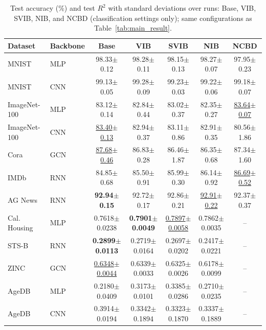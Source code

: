 \begin{table}[t]
\centering
\caption{Test accuracy (\%) and test $R^2$ with standard deviations over runs: Base, VIB, SVIB, NIB, and NCBD (classification settings only); same configurations as Table~\ref{tab:main_result}.}
\label{tab:main_result_std_baselines}
\small
{
\setlength{\tabcolsep}{1.5pt}
\begin{tabular}{llccccc}
\hline
Dataset & Backbone & Base & VIB & SVIB & NIB & NCBD \\
\hline
MNIST & MLP & 98.33$\pm$0.12 & 98.28$\pm$0.11 & 98.15$\pm$0.13 & 98.27$\pm$0.07 & 97.95$\pm$0.23 \\
MNIST & CNN & 99.13$\pm$0.05 & 99.28$\pm$0.09 & 99.23$\pm$0.03 & 99.22$\pm$0.06 & 99.18$\pm$0.07 \\
ImageNet-100 & MLP & 83.12$\pm$0.14 & 82.84$\pm$0.44 & 83.02$\pm$0.37 & 82.35$\pm$0.27 & \underline{83.64$\pm$0.07} \\
ImageNet-100 & CNN & \underline{83.40$\pm$0.13} & 82.94$\pm$0.37 & 83.11$\pm$0.86 & 82.91$\pm$0.35 & 80.56$\pm$1.86 \\
Cora & GCN & \underline{87.68$\pm$0.46} & 86.83$\pm$0.28 & 86.46$\pm$1.87 & 86.35$\pm$0.68 & 87.34$\pm$1.60 \\
IMDb & RNN & 84.85$\pm$0.68 & 85.50$\pm$0.91 & 85.99$\pm$0.30 & 86.14$\pm$0.92 & \underline{86.69$\pm$0.52} \\
AG News & RNN & \textbf{92.94$\pm$0.15} & 92.72$\pm$0.17 & 92.86$\pm$0.21 & \underline{92.91$\pm$0.22} & 92.37$\pm$0.37 \\
\hline\hline
Cal. Housing & MLP & 0.7618$\pm$0.0238 & \textbf{0.7901$\pm$0.0049} & \underline{0.7897$\pm$0.0058} & 0.7862$\pm$0.0035 & -- \\
STS-B & RNN & \textbf{0.2899$\pm$0.0113} & 0.2719$\pm$0.0164 & 0.2697$\pm$0.0202 & 0.2417$\pm$0.0221 & -- \\
ZINC & GCN & \underline{0.6348$\pm$0.0044} & 0.6339$\pm$0.0033 & 0.6325$\pm$0.0026 & 0.6178$\pm$0.0099 & -- \\
AgeDB & MLP & 0.2180$\pm$0.0409 & 0.3173$\pm$0.0101 & 0.3385$\pm$0.0286 & 0.2710$\pm$0.0235 & -- \\
AgeDB & CNN & 0.3914$\pm$0.0194 & 0.3342$\pm$0.1894 & 0.3323$\pm$0.1870 & 0.3337$\pm$0.1889 & -- \\
\hline
\end{tabular}
}
\end{table}
